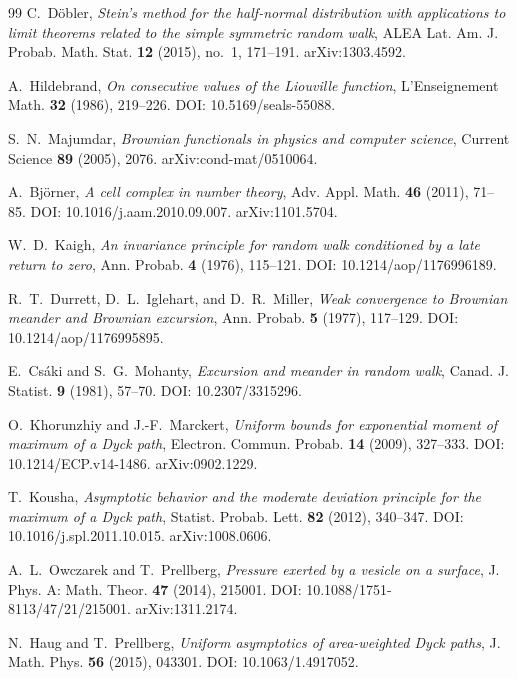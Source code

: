 \documentclass[11pt]{amsart}
\numberwithin{equation}{section}
\theoremstyle{plain}
\theoremstyle{definition}
\theoremstyle{remark}
\begin{document}
\begin{thebibliography}{99}
C.~D\"obler,
\emph{Stein's method for the half-normal distribution with applications to
limit theorems related to the simple symmetric random walk},
ALEA Lat. Am. J. Probab. Math. Stat. \textbf{12} (2015), no.~1, 171--191.
arXiv:1303.4592.

A.~Hildebrand,
\emph{On consecutive values of the Liouville function},
L'Enseignement Math. \textbf{32} (1986), 219--226.
DOI: 10.5169/seals-55088.

S.~N.~Majumdar,
\emph{Brownian functionals in physics and computer science},
Current Science \textbf{89} (2005), 2076.
arXiv:cond-mat/0510064.

A.~Bj\"orner,
\emph{A cell complex in number theory},
Adv. Appl. Math. \textbf{46} (2011), 71--85.
DOI: 10.1016/j.aam.2010.09.007.
arXiv:1101.5704.

W.~D.~Kaigh,
\emph{An invariance principle for random walk conditioned by a late return to zero},
Ann. Probab. \textbf{4} (1976), 115--121.
DOI: 10.1214/aop/1176996189.

R.~T.~Durrett, D.~L.~Iglehart, and D.~R.~Miller,
\emph{Weak convergence to Brownian meander and Brownian excursion},
Ann. Probab. \textbf{5} (1977), 117--129.
DOI: 10.1214/aop/1176995895.

E.~Cs\'aki and S.~G.~Mohanty,
\emph{Excursion and meander in random walk},
Canad. J. Statist. \textbf{9} (1981), 57--70.
DOI: 10.2307/3315296.

O.~Khorunzhiy and J.-F.~Marckert,
\emph{Uniform bounds for exponential moment of maximum of a Dyck path},
Electron. Commun. Probab. \textbf{14} (2009), 327--333.
DOI: 10.1214/ECP.v14-1486.
arXiv:0902.1229.

T.~Kousha,
\emph{Asymptotic behavior and the moderate deviation principle for the maximum of a Dyck path},
Statist. Probab. Lett. \textbf{82} (2012), 340--347.
DOI: 10.1016/j.spl.2011.10.015.
arXiv:1008.0606.

A.~L.~Owczarek and T.~Prellberg,
\emph{Pressure exerted by a vesicle on a surface},
J. Phys. A: Math. Theor. \textbf{47} (2014), 215001.
DOI: 10.1088/1751-8113/47/21/215001.
arXiv:1311.2174.

N.~Haug and T.~Prellberg,
\emph{Uniform asymptotics of area-weighted Dyck paths},
J. Math. Phys. \textbf{56} (2015), 043301.
DOI: 10.1063/1.4917052.


\end{thebibliography}
\end{document}
